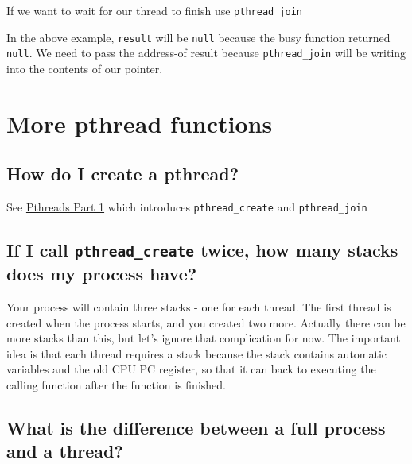 If we want to wait for our thread to finish use \texttt{pthread\_join}

\begin{Shaded}
\begin{Highlighting}[]
 
\end{Highlighting}
\end{Shaded}

In the above example, \texttt{result} will be \texttt{null} because the
busy function returned \texttt{null}. We need to pass the address-of
result because \texttt{pthread\_join} will be writing into the contents
of our pointer.

\section{More pthread functions}\label{more-pthread-functions}

\subsection{How do I create a pthread?}\label{how-do-i-create-a-pthread}

See
\href{https://github.com/angrave/SystemProgramming/wiki/Pthreads,-Part-1:-Introduction}{Pthreads
Part 1} which introduces \texttt{pthread\_create} and
\texttt{pthread\_join}

\subsection{\texorpdfstring{If I call \texttt{pthread\_create} twice,
how many stacks does my process
have?}{If I call pthread\_create twice, how many stacks does my process have?}}\label{if-i-call-pthreadux5fcreate-twice-how-many-stacks-does-my-process-have}

Your process will contain three stacks - one for each thread. The first
thread is created when the process starts, and you created two more.
Actually there can be more stacks than this, but let's ignore that
complication for now. The important idea is that each thread requires a
stack because the stack contains automatic variables and the old CPU PC
register, so that it can back to executing the calling function after
the function is finished.

\subsection{What is the difference between a full process and a
thread?}\label{what-is-the-difference-between-a-full-process-and-a-thread}

